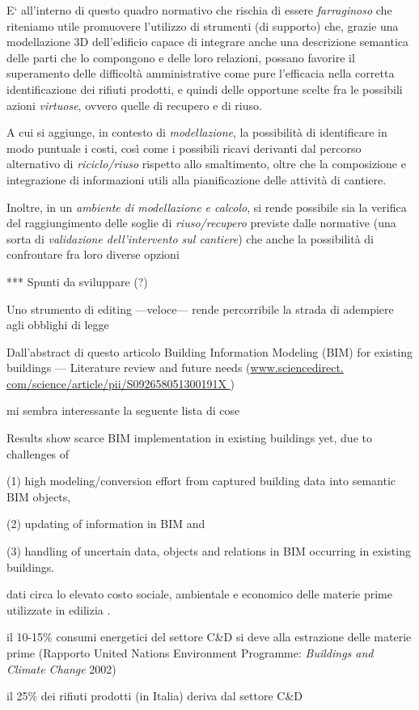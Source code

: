 E` all’interno di questo quadro normativo che rischia di essere \textit{farraginoso} che riteniamo utile promuovere l’utilizzo di strumenti (di supporto) che, grazie una modellazione 3D dell’edificio capace di integrare anche una descrizione semantica delle parti che lo compongono e delle loro relazioni, possano favorire il superamento delle difficolt\`a amministrative come pure l’efficacia nella corretta identificazione dei rifiuti prodotti, e quindi delle opportune scelte fra le possibili azioni \textit{virtuose}, ovvero quelle di recupero e di riuso.

A cui si aggiunge, in contesto di \textit{modellazione}, la possibilit\`a di identificare in modo puntuale i costi, così come i possibili ricavi derivanti dal percorso alternativo di \textit{riciclo/riuso} rispetto allo smaltimento, oltre che la composizione e integrazione di informazioni utili alla pianificazione delle attività di cantiere.
 
Inoltre, in un \textit{ambiente di modellazione e calcolo}, si rende possibile sia la verifica del raggiungimento delle soglie di \textit{riuso/recupero} previste dalle normative (una sorta di \textit{validazione dell’intervento sul cantiere}) che anche la possibilit\`a di confrontare fra loro diverse opzioni  





*** Spunti da sviluppare (?)

Uno strumento di editing ---veloce--- rende percorribile la strada di adempiere agli obblighi di legge

Dall’abstract di questo articolo Building Information Modeling (BIM) for existing buildings — Literature review and future needs (\url{www.sciencedirect.
com/science/article/pii/S092658051300191X }) 

mi sembra interessante la seguente lista di cose 

Results show scarce BIM implementation in existing buildings yet, due to challenges of 

(1) high modeling/conversion effort from captured building data into semantic BIM objects, 

(2) updating of information in BIM and 

(3) handling of uncertain data, objects and relations in BIM occurring in existing buildings.


dati circa lo elevato costo sociale, ambientale e economico delle materie prime utilizzate in edilizia .

il 10-15\% consumi energetici del settore C\&D si deve alla estrazione delle materie prime (Rapporto United Nations Environment Programme: \textit{Buildings and Climate Change} 2002)

il 25\% dei rifiuti prodotti (in Italia) deriva dal settore C\&D

